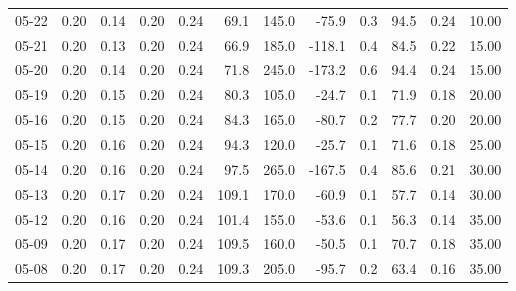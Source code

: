 \begin{threeparttable}
{\begin{tabular}{lrrrrrrrrrrr}
  05-22 &          0.20 &          0.14 &          0.20 &        0.24 &                69.1 &               145.0 &      -75.9 &                 0.3 &             94.5 &            0.24 &                  10.00 \\
  05-21 &          0.20 &          0.13 &          0.20 &        0.24 &                66.9 &               185.0 &     -118.1 &                 0.4 &             84.5 &            0.22 &                  15.00 \\
  05-20 &          0.20 &          0.14 &          0.20 &        0.24 &                71.8 &               245.0 &     -173.2 &                 0.6 &             94.4 &            0.24 &                  15.00 \\
  05-19 &          0.20 &          0.15 &          0.20 &        0.24 &                80.3 &               105.0 &      -24.7 &                 0.1 &             71.9 &            0.18 &                  20.00 \\
  05-16 &          0.20 &          0.15 &          0.20 &        0.24 &                84.3 &               165.0 &      -80.7 &                 0.2 &             77.7 &            0.20 &                  20.00 \\
  05-15 &          0.20 &          0.16 &          0.20 &        0.24 &                94.3 &               120.0 &      -25.7 &                 0.1 &             71.6 &            0.18 &                  25.00 \\
  05-14 &          0.20 &          0.16 &          0.20 &        0.24 &                97.5 &               265.0 &     -167.5 &                 0.4 &             85.6 &            0.21 &                  30.00 \\
  05-13 &          0.20 &          0.17 &          0.20 &        0.24 &               109.1 &               170.0 &      -60.9 &                 0.1 &             57.7 &            0.14 &                  30.00 \\
  05-12 &          0.20 &          0.16 &          0.20 &        0.24 &               101.4 &               155.0 &      -53.6 &                 0.1 &             56.3 &            0.14 &                  35.00 \\
  05-09 &          0.20 &          0.17 &          0.20 &        0.24 &               109.5 &               160.0 &      -50.5 &                 0.1 &             70.7 &            0.18 &                  35.00 \\
  05-08 &          0.20 &          0.17 &          0.20 &        0.24 &               109.3 &               205.0 &      -95.7 &                 0.2 &             63.4 &            0.16 &                  35.00 \\

\end{tabular}}
\end{threeparttable}

